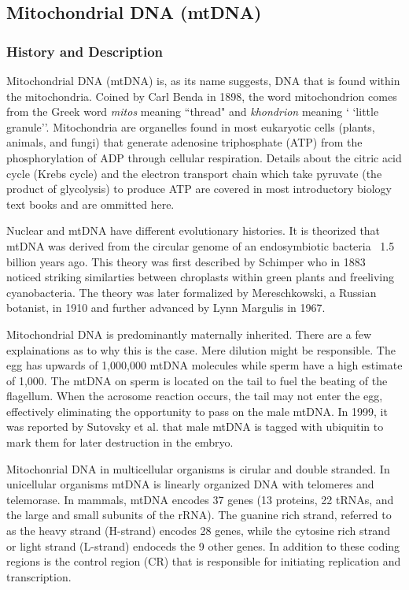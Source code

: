 \documentclass[11pt, oneside]{article}
\begin{document}
\subsection{Mitochondrial DNA (mtDNA)}
\subsubsection{History and Description}
Mitochondrial DNA (mtDNA) is, as its name suggests, DNA that is found within the mitochondria.
Coined by Carl Benda in 1898, the word mitochondrion comes from the Greek word \textit{mitos} 
meaning ``thread" and \textit{khondrion} meaning ` `little granule''. Mitochondria are organelles 
found in most eukaryotic cells (plants, animals, and 
fungi) that generate adenosine triphosphate (ATP) from the phosphorylation of ADP through
cellular respiration. Details about the citric acid cycle (Krebs cycle) and the electron transport %
chain which take pyruvate (the product of glycolysis) to produce ATP are covered in most 
introductory biology text books and are ommitted here. 

Nuclear and mtDNA have different evolutionary histories. It is theorized that mtDNA was derived from
the circular genome of an endosymbiotic bacteria ~1.5 billion years ago. This theory was first 
described by Schimper who in 1883 noticed striking similarties between chroplasts within green plants and 
freeliving cyanobacteria. The theory was later formalized by Mereschkowski, a Russian botanist, in 1910 and 
 further advanced by Lynn Margulis in 1967. 

Mitochondrial DNA is predominantly maternally inherited. There are a few explainations as to why
this is the case. Mere dilution might be responsible. The egg has upwards of 1,000,000 mtDNA molecules
while sperm have a high estimate of 1,000. The mtDNA on sperm is located on the tail to fuel the beating
of the flagellum. When the acrosome reaction occurs, the tail may not enter the egg, effectively eliminating
the opportunity to pass on the male mtDNA. In 1999, it was reported by Sutovsky et al. that male
mtDNA is tagged with ubiquitin to mark them for later destruction in the embryo. 

Mitochonrial DNA in multicellular organisms is cirular and double stranded. In unicellular organisms mtDNA
is linearly organized DNA with telomeres and telemorase. In mammals, mtDNA encodes 37 genes (13 proteins, 
22 tRNAs, and the large and small subunits of the rRNA). The guanine rich strand, referred to
as the heavy strand (H-strand) encodes 28 genes, while the cytosine rich strand or light strand (L-strand)
endoceds the 9 other genes. In addition to these coding regions is the control region (CR) that is
responsible for initiating replication and transcription.
\end{document}

